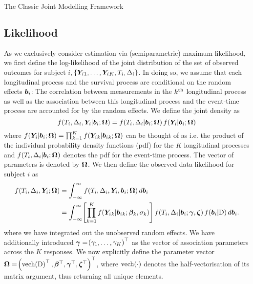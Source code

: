 \begin{chapter}{\label{cha:methods-classic}The Classic Joint Modelling Framework}
  \subsection{\label{sec:methods-likelihood}Likelihood}
  As we exclusively consider estimation via (semiparametric) maximum likelihood, we first define the log-likelihood of the joint distribution of the set of observed outcomes for subject $i$, $\!\left\{\bm{Y}_i{_1},\dots,\bm{Y}_i{_K},T_i,\Delta_i\right\}$. In doing so, we assume that each longitudinal process and the survival process are conditional on the random effects $\bm{b}_i$: The correlation between measurements in the $k^{\text{th}}$ longitudinal process as well as the association between this longitudinal process and the event-time process are accounted for by the random effects. We define the joint density as 
  \begin{equation}
      f\!\left( T_i, \Delta_i, \bm{Y}_i|\bm{b}_i;\bm{\mathrm{\Omega}}\right) = f\!\left( T_i,\Delta_i|\bm{b}_i;\bm{\mathrm{\Omega}}\right) f\!\left(\bm{Y}_i|\bm{b}_i;\bm{\mathrm{\Omega}}\right)
  \label{eq:methods-cond-indep}
  \end{equation}
  where $f\!\left(\bm{Y}_i|\bm{b}_i;\bm{\mathrm{\Omega}}\right)=\prod_{k=1}^Kf\!\left(\bm{Y}_i{_k}|\bm{b}_i{_k};\bm{\mathrm{\Omega}}\right)$ can be thought of as i.e. the product of the individual probability density functions (pdf) for the $K$ longitudinal processes and $f(T_i,\Delta_i|\bm{b}_i;\bm{\mathrm{\Omega}})$ denotes the pdf for the event-time process. The vector of parameters is denoted by $\bm{\mathrm{\Omega}}$. We then define the observed data likelihood for subject $i$ as
    \begin{align}
    f\!\left( T_i, \Delta_i, \bm{Y}_i; \bm{\mathrm{\Omega}}\right) &= \int_{-\infty}^\infty f\!\left( T_i, \Delta_i, \bm{Y}_i, \bm{b}_i; \bm{\mathrm{\Omega}}\right) d\bm{b}_i \nonumber \\
    &= \int_{-\infty}^\infty\!\left[\prod_{k=1}^Kf\!\left(\bm{Y}_i{_k}|\bm{b}_i{_k};\bm{\beta}_k,\sigma_k\right)\right] f\!\left( T_i,\Delta_i|\bm{b}_i;\bm{\gamma},\bm{\zeta}\right) f\!\left(\bm{b}_i|\mathrm{D}\right) d\bm{b}_i.
    \label{eq:methods-obs-likelihood}
    \end{align}
  where we have integrated out the unobserved random effects. We have additionally introduced $\bm{\gamma}=\!\left(\gamma_1,\dots,\gamma_K\right)^\top$ as the vector of association parameters across the $K$ responses. We now explicitly define the parameter vector $\bm{\mathrm{\Omega}}=\!\left(\text{vech}\!\left(\mathrm{D}\right)^\top,\bm{\beta}^\top,\bm{\gamma}^\top,\bm{\zeta}^\top\right)^\top$, where $\text{vech}(\cdot)$ denotes the half-vectorisation of its matrix argument, thus returning all unique elements.
  

\end{chapter}

